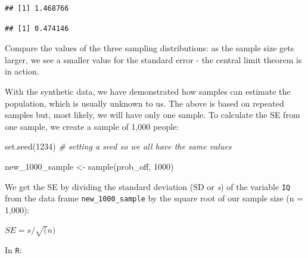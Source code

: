 \documentclass[
]{book}
\newenvironment{Shaded}{\begin{snugshade}}{\end{snugshade}}
\newcommand{\CommentTok}[1]{\textcolor[rgb]{0.56,0.35,0.01}{\textit{#1}}}
\newcommand{\DecValTok}[1]{\textcolor[rgb]{0.00,0.00,0.81}{#1}}
\newcommand{\FunctionTok}[1]{\textcolor[rgb]{0.00,0.00,0.00}{#1}}
\newcommand{\NormalTok}[1]{#1}
\newcommand{\OtherTok}[1]{\textcolor[rgb]{0.56,0.35,0.01}{#1}}
\newcommand{\SpecialCharTok}[1]{\textcolor[rgb]{0.00,0.00,0.00}{#1}}
\begin{document}
\begin{Shaded}
\end{Shaded}

\begin{verbatim}
## [1] 1.468766
\end{verbatim}

\begin{Shaded}
\end{Shaded}

\begin{verbatim}
## [1] 0.474146
\end{verbatim}

Compare the values of the three sampling distributions: as the sample size gets larger, we see a smaller value for the standard error - the central limit theorem is in action.

With the synthetic data, we have demonstrated how samples can estimate the population, which is usually unknown to us. The above is based on repeated samples but, most likely, we will have only one sample. To calculate the SE from one sample, we create a sample of 1,000 people:

\begin{Shaded}
\begin{Highlighting}[]
\FunctionTok{set.seed}\NormalTok{(}\DecValTok{1234}\NormalTok{) }\CommentTok{\# setting a seed so we all have the same values}

\NormalTok{new\_1000\_sample }\OtherTok{\textless{}{-}} \FunctionTok{sample}\NormalTok{(prob\_off, }\DecValTok{1000}\NormalTok{)}
\end{Highlighting}
\end{Shaded}

We get the SE by dividing the standard deviation (SD or \emph{s}) of the variable \texttt{IQ} from the data frame \texttt{new\_1000\_sample} by the square root of our sample size (n = 1,000):

\(SE = s/\sqrt(n)\)

In \texttt{R}:

\begin{Shaded}
\end{Shaded}
\end{document}
